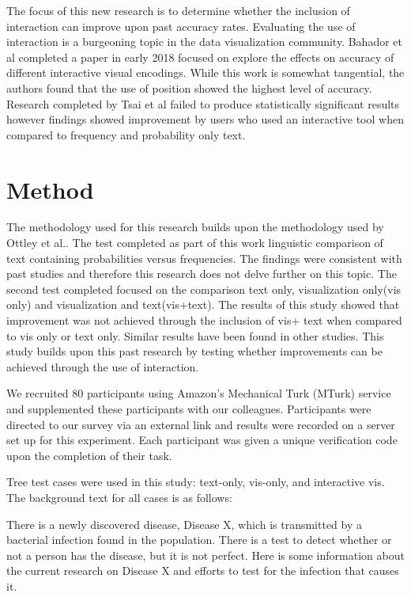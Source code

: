 The focus of this new research is to determine whether the inclusion of
interaction can improve upon past accuracy rates. Evaluating the use of
interaction is a burgeoning topic in the data visualization community.
Bahador et al completed a paper in early 2018 focused on explore the effects
on accuracy of different interactive visual encodings. While this work is
somewhat tangential, the authors found that the use of position showed the
highest level of accuracy. Research completed by Tsai et al \cite{Tsai2011} failed to
produce statistically significant results however findings showed improvement
by users who used an interactive tool when compared to frequency and
probability only text.




\section{Method}
The methodology used for this research builds upon the methodology used by
Ottley et al.\cite{Ottley2016}. The test completed as part of this work 
linguistic comparison of text containing probabilities versus frequencies.
The findings were consistent with past studies and therefore this research
does not delve further on this topic. The second test completed focused on
the comparison text only, visualization only(vis only) and visualization and
text(vis+text). The results of this study showed that improvement was not
achieved through the inclusion of vis+ text when compared to vis only or text
only. Similar results have been found in other studies. This study builds
upon this past research by testing whether improvements can be achieved
through the use of interaction.

We recruited 80 participants using Amazon's Mechanical Turk (MTurk) service and supplemented these participants with our colleagues. Participants were directed to our survey via an external link and results were recorded on a server set up for this experiment. Each participant was given a unique verification code upon the completion of their task. 

Tree test cases were used in this study: text-only, vis-only, and interactive vis. The background text for all cases is as follows:

\begin{displayquote}
    There is a newly discovered disease, Disease X, which is transmitted by a bacterial infection found in the population. There is a test to detect whether or not a person has the disease, but it is not perfect. Here is some information about the current research on Disease X and efforts to test for the infection that causes it.
\end{displayquote}


